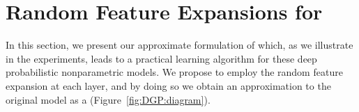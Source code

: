 \section{Random Feature Expansions for }






In this section, we present our approximate formulation of  which, as we illustrate in the experiments, leads to a practical learning algorithm for these deep probabilistic nonparametric models.
We propose to employ the random feature expansion at each layer, and by doing so we obtain an approximation to the original \dgp model as a \dnn (Figure~\ref{fig:DGP:diagram}).


